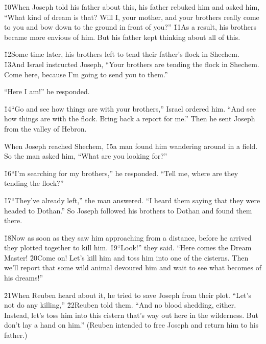 \v{10}When Joseph told his father about this, his father rebuked him and asked him, ``What kind of dream is that? Will I, your mother, and your brothers really come to you and bow down to the ground in front of you?'' \v{11}As a result, his brothers became more envious of him. But his father kept thinking about all of this.

\v{12}Some time later, his brothers left to tend their father's flock in Shechem. \v{13}And Israel instructed Joseph, ``Your brothers are tending the flock in Shechem. Come here, because I'm going to send you to them.''

``Here I am!'' he responded.

\v{14}``Go and see how things are with your brothers,'' Israel ordered him. ``And see how things are with the flock. Bring back a report for me.'' Then he sent Joseph from the valley of Hebron.

When Joseph reached Shechem, \v{15}a man found him wandering around in a field. So the man asked him, ``What are you looking for?''

\v{16}``I'm searching for my brothers,'' he responded. ``Tell me, where are they tending the flock?''

\v{17}``They've already left,'' the man answered. ``I heard them saying that they were headed to Dothan.'' So Joseph followed his brothers to Dothan and found them there.

\v{18}Now as soon as they saw him approaching from a distance, before he arrived they plotted together to kill him. \v{19}``Look!'' they said. ``Here comes the Dream Master! \v{20}Come on! Let's kill him and toss him into one of the cisterns. Then we'll report that some wild animal devoured him and wait to see what becomes of his dreams!''

\v{21}When Reuben heard about it, he tried to save Joseph from their plot. ``Let's not do any killing,'' \v{22}Reuben told them. ``And no blood shedding, either. Instead, let's toss him into this cistern that's way out here in the wilderness. But don't lay a hand on him.'' (Reuben intended to free Joseph and return him to his father.)

